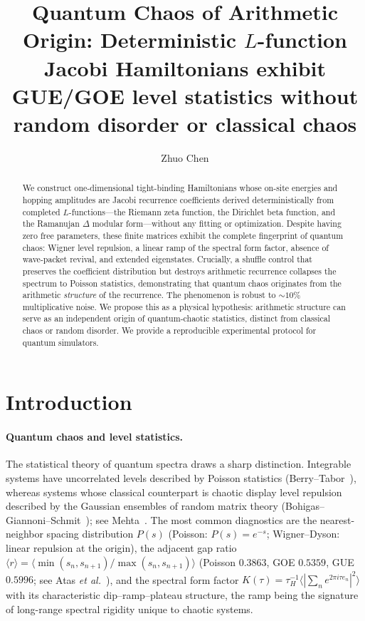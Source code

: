 \documentclass[aps,prx,reprint,floatfix]{revtex4-2}
\begin{document}
\title{Quantum Chaos of Arithmetic Origin: Deterministic $L$-function Jacobi Hamiltonians exhibit GUE/GOE level statistics without random disorder or classical chaos}
\author{Zhuo Chen}

\begin{abstract}
We construct one-dimensional tight-binding Hamiltonians whose on-site energies
and hopping amplitudes are Jacobi recurrence coefficients derived deterministically
from completed $L$-functions---the Riemann zeta function, the Dirichlet beta
function, and the Ramanujan $\Delta$ modular form---without any fitting or
optimization. Despite having zero free parameters, these finite matrices exhibit
the complete fingerprint of quantum chaos: Wigner level repulsion, a linear ramp
of the spectral form factor, absence of wave-packet revival, and extended
eigenstates. Crucially, a shuffle control that preserves the coefficient
distribution but destroys arithmetic recurrence collapses the spectrum to Poisson
statistics, demonstrating that quantum chaos originates from the arithmetic
\emph{structure} of the recurrence. The phenomenon is robust to $\sim10\%$
multiplicative noise. We propose this as a physical hypothesis: arithmetic
structure can serve as an independent origin of quantum-chaotic statistics,
distinct from classical chaos or random disorder. We provide a reproducible
experimental protocol for quantum simulators.
\end{abstract}


\maketitle

\section{Introduction}
\label{sec:intro}

\paragraph{Quantum chaos and level statistics.}
The statistical theory of quantum spectra draws a sharp distinction.
Integrable systems have uncorrelated levels described by Poisson statistics
(Berry--Tabor~\cite{berry1977}), whereas systems whose classical counterpart is
chaotic display level repulsion described by the Gaussian ensembles of random
matrix theory (Bohigas--Giannoni--Schmit~\cite{bgs1984}); see
Mehta~\cite{mehta}. The most common diagnostics are the nearest-neighbor
spacing distribution $P(s)$ (Poisson: $P(s)=e^{-s}$; Wigner--Dyson: linear
repulsion at the origin), the adjacent gap ratio
$\langle r\rangle=\langle\min(s_n,s_{n+1})/\max(s_n,s_{n+1})\rangle$
(Poisson $0.3863$, GOE $0.5359$, GUE $0.5996$; see Atas \emph{et
al.}~\cite{atas2013}), and the spectral form factor
$K(\tau)=\tau_H^{-1}\langle |\sum_n e^{2\pi i \tau e_n}|^2\rangle$
with its characteristic dip--ramp--plateau structure, the ramp being the
signature of long-range spectral rigidity unique to chaotic systems.
\end{document}
